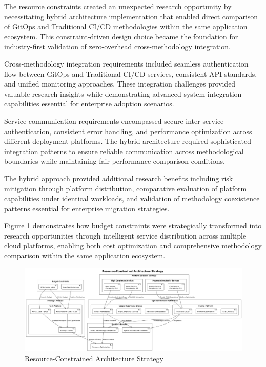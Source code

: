 The resource constraints created an unexpected research opportunity by necessitating hybrid architecture implementation that enabled direct comparison of GitOps and Traditional CI/CD methodologies within the same application ecosystem. This constraint-driven design choice became the foundation for industry-first validation of zero-overhead cross-methodology integration.

Cross-methodology integration requirements included seamless authentication flow between GitOps and Traditional CI/CD services, consistent API standards, and unified monitoring approaches. These integration challenges provided valuable research insights while demonstrating advanced system integration capabilities essential for enterprise adoption scenarios.

Service communication requirements encompassed secure inter-service authentication, consistent error handling, and performance optimization across different deployment platforms. The hybrid architecture required sophisticated integration patterns to ensure reliable communication across methodological boundaries while maintaining fair performance comparison conditions.


The hybrid approach provided additional research benefits including risk mitigation through platform distribution, comparative evaluation of platform capabilities under identical workloads, and validation of methodology coexistence patterns essential for enterprise migration strategies.

Figure \ref{fig:resource-constrained-architecture} demonstrates how budget constraints were strategically transformed into research opportunities through intelligent service distribution across multiple cloud platforms, enabling both cost optimization and comprehensive methodology comparison within the same application ecosystem.

\begin{figure}[H]
\centering
\includegraphics[width=1.0\textwidth]{figures/Resource-Constrained-Architecture-Strategy.png}
\caption{Resource-Constrained Architecture Strategy}
\label{fig:resource-constrained-architecture}
\end{figure}

